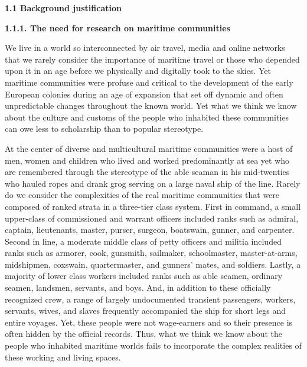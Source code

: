 \begin{styleNormali}
\textbf{1.1 Background justification }
\end{styleNormali}

\begin{styleNormali}
\textbf{1.1.1. The need for research on maritime communities}
\end{styleNormali}

\begin{styleNormali}
We live in a world so interconnected by air travel, media and online networks that we rarely consider the importance of maritime travel or those who depended upon it in an age before we physically and digitally took to the skies. Yet maritime communities were profuse and critical to the development of the early European colonies during an age of expansion that set off dynamic and often unpredictable changes throughout the known world. Yet what we think we know about the culture and customs of the people who inhabited these communities can owe less to scholarship than to popular stereotype. 
\end{styleNormali}

\begin{styleNormali}
At the center of diverse and multicultural maritime communities were a host of men, women and children who lived and worked predominantly at sea yet who are remembered through the stereotype of the able seaman in his mid-twenties who hauled ropes and drank grog serving on a large naval ship of the line. Rarely do we consider the complexities of the real maritime communities that were composed of ranked strata in a three-tier class system. First in command, a small upper-class of commissioned and warrant officers included ranks such as admiral, captain, lieutenants, master, purser, surgeon, boatswain, gunner, and carpenter. Second in line, a moderate middle class of petty officers and militia included ranks such as armorer, cook, gunsmith, sailmaker, schoolmaster, master-at-arms, midshipmen, coxswain, quartermaster, and gunners’ mates, and soldiers. Lastly, a majority of lower class workers included ranks such as able seamen, ordinary seamen, landsmen, servants, and boys. And, in addition to these officially recognized crew, a range of largely undocumented transient passengers, workers, servants, wives, and slaves frequently accompanied the ship for short legs and entire voyages. Yet, these people were not wage-earners and so their presence is often hidden by the official records. Thus, what we think we know about the people who inhabited maritime worlds fails to incorporate the complex realities of these working and living spaces. \ 
\end{styleNormali}

